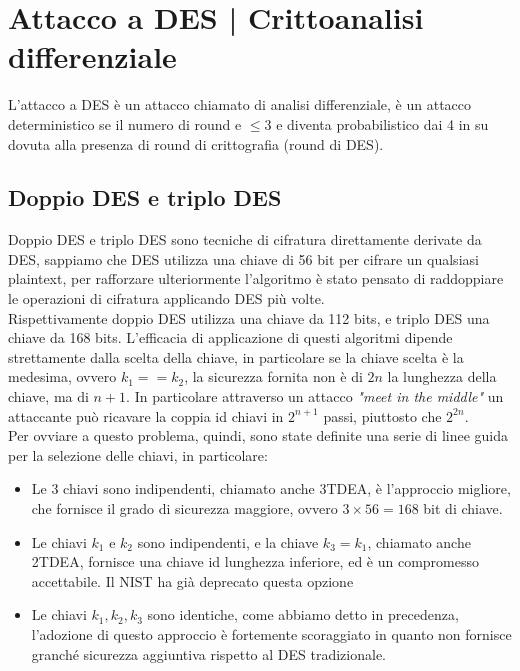 \documentclass[11pt, oneside]{article}   	%
\begin{document}
\section*{Attacco a DES | Crittoanalisi differenziale}
L'attacco a DES è un attacco chiamato di analisi differenziale, è un attacco deterministico se il numero di round e $\leq 3$ e diventa probabilistico dai 4 in su dovuta alla presenza di round di crittografia (round di DES). 



\subsection*{Doppio DES e triplo DES}
Doppio DES e triplo DES sono tecniche di cifratura direttamente derivate da DES, sappiamo che DES utilizza una chiave di 56 bit per cifrare un qualsiasi plaintext, per rafforzare ulteriormente l'algoritmo è stato pensato di raddoppiare le operazioni di cifratura applicando DES più volte.\\

Rispettivamente doppio DES utilizza una chiave da 112 bits, e triplo DES una chiave da 168 bits.
L'efficacia di applicazione di questi algoritmi dipende strettamente dalla scelta della chiave, in particolare se la chiave scelta è la medesima, ovvero $k_1 == k_2$, la sicurezza fornita non è di $2n$ la lunghezza della chiave, ma di $n+1$. In particolare attraverso un attacco \emph{"meet in the middle"} un attaccante può ricavare la coppia id chiavi in $2^{n+1}$ passi, piuttosto che $2^{2n}$.\\

Per ovviare a questo problema, quindi, sono state definite una serie di linee guida per la selezione delle chiavi, in particolare:
\begin{itemize}
\item Le 3 chiavi sono indipendenti, chiamato anche 3TDEA, è l'approccio migliore, che fornisce il grado di sicurezza maggiore, ovvero $3 \times 56 = 168$ bit di chiave.
\item Le chiavi $k_1$ e $k_2$ sono indipendenti, e la chiave $k_3 = k_1$, chiamato anche 2TDEA, fornisce una chiave id lunghezza inferiore, ed è un compromesso accettabile. Il NIST ha già deprecato questa opzione
\item Le chiavi $k_1, k_2, k_3$ sono identiche, come abbiamo detto in precedenza, l'adozione di questo approccio è fortemente scoraggiato in quanto non fornisce granché sicurezza aggiuntiva rispetto al DES tradizionale.
\end{itemize}
\end{document}
